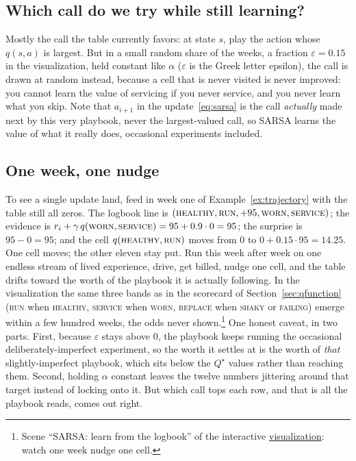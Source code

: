 \documentclass[11pt,a4paper]{article}
\theoremstyle{definition}
\theoremstyle{remark}
\numberwithin{equation}{section}
\newcommand{\sa}[1]{\textsc{#1}}   %
\newcommand{\vizhref}[1]{\href{https://sml-fs26.github.io/classic_rl/repair-or-replace/}{#1}}
\begin{document}
\subsection*{Which call do we try while still learning?}

Mostly the call the table currently favors: at state $s$, play the action whose $q(s, a)$ is
largest. But in a small random share of the weeks, a fraction $\varepsilon = 0.15$ in the
visualization, held constant like $\alpha$ ($\varepsilon$ is the Greek letter epsilon), the
call is drawn at random instead, because a cell that is never visited is never improved: you
cannot learn the value of servicing if you never service, and you never learn what you skip.
Note that $a_{i+1}$ in the update~\eqref{eq:sarsa} is the call \emph{actually} made next by
this very playbook, never the largest-valued call, so SARSA learns the value of what it really
does, occasional experiments included.

\subsection*{One week, one nudge}

To see a single update land, feed in week one of Example~\ref{ex:trajectory} with the table
still all zeros. The logbook line is $(\sa{healthy}, \sa{run}, +95, \sa{worn}, \sa{service})$;
the evidence is $r_i + \gamma\, q(\sa{worn}, \sa{service}) = 95 + 0.9 \cdot 0 = 95$; the
surprise is $95 - 0 = 95$; and the cell $q(\sa{healthy}, \sa{run})$ moves from $0$ to
$0 + 0.15 \cdot 95 = 14.25$. One cell moves; the other eleven stay put. Run this week after
week on one endless stream of lived experience, drive, get billed, nudge one cell, and the
table drifts toward the worth of the playbook it is actually following. In the visualization
the same three bands as in the scorecard of Section~\ref{sec:qfunction} (\sa{run} when
\sa{healthy}, \sa{service} when \sa{worn}, \sa{replace} when \sa{shaky} or \sa{failing}) emerge
within a few hundred weeks, the odds never shown.\footnote{Scene ``SARSA: learn from the
logbook'' of the interactive \vizhref{visualization}: watch one week nudge one cell.} One
honest caveat, in two parts. First, because $\varepsilon$ stays above $0$, the playbook keeps
running the occasional deliberately-imperfect experiment, so the worth it settles at is the
worth of \emph{that} slightly-imperfect playbook, which sits below the $Q^\star$ values rather
than reaching them. Second, holding $\alpha$ constant leaves the twelve numbers jittering
around that target instead of locking onto it. But which call tops each row, and that is all
the playbook reads, comes out right.
\end{document}
